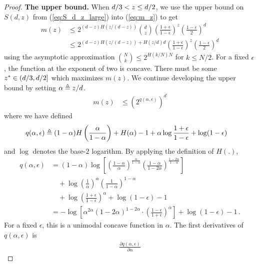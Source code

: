 \begin{proof}
\textbf{The upper bound.} When $d/3 < z \leq d/2$, we use the upper bound on $S(d, z)$ from (\ref{eq:S_d_z_large}) into (\ref{eq:m_z}) to get
\begin{align*}
m(z) 
&\leq 2^{(d-z)H(z/(d- z))} {d \choose z} \left(\frac{1+\epsilon}{1-\epsilon}\right)^{z} \left(\frac{1-\epsilon}{2}\right)^{d} \\
&\leq 2^{(d-z)H(z/(d- z)) + H(z/d) d}\left(\frac{1+\epsilon}{1-\epsilon}\right)^{z} \left(\frac{1-\epsilon}{2}\right)^{d}
\end{align*}
using the asymptotic approximation ${N\choose k} \leq 2^{H(k/N)N}$ for $k \leq N/2$. For a fixed $\epsilon$, the function at the exponent of two is concave. There must be some $z^* \in (d/3, d/2]$ which maximizes $m(z)$. We continue developing the upper bound by setting $\alpha \triangleq z/d$. 
\begin{align}
m(z) 
&\leq \left( 2^{q(\alpha, \epsilon)}\right)^d \label{eq:t2star-q2}
\end{align}
where we have defined
\begin{align} \label{eq:q2}
q(\alpha, \epsilon)
& \triangleq (1-\alpha) H\left( \frac{\alpha}{1-\alpha} \right) +
H(\alpha) 
-1  + \alpha \log \frac{1+\epsilon}{1-\epsilon} + \log (1-\epsilon)
\end{align}
and $\log$ denotes the base-$2$ logarithm. By applying the definition of $H(.)$,
\begin{align}\label{eq:q2-expanded}
q(\alpha, \epsilon)
&= (1-\alpha) \log\left[
\left( \frac{1-\alpha}{\alpha} \right)^{\frac{\alpha}{1-\alpha} }
\left(\frac{1-\alpha}{1-2\alpha} \right)^{\frac{1-2\alpha}{1-\alpha} }\right] \nonumber \\
& \quad+ \log \left(\frac{1}{\alpha}\right)^\alpha \left(\frac{1}{1-\alpha}\right)^{1-\alpha} \nonumber \\
& \quad+ \log \left(\frac{1+\epsilon}{1-\epsilon}\right)^\alpha + \log(1-\epsilon) -1 \nonumber \\
&= -\log \left[ 
\alpha^{2\alpha} 
(1-2\alpha)^{1-2\alpha} 
\cdot \left(\frac{1-\epsilon}{1+\epsilon}\right)^\alpha 
\right] + \log(1-\epsilon) - 1\, .
\end{align}
For a fixed $\epsilon$, this is a unimodal concave function in $\alpha$. The first derivatives of $q(\alpha, \epsilon)$ is
\begin{align*}
\frac{\partial q(\alpha, \epsilon)}{\partial \alpha}

\end{align*}
\end{proof}
